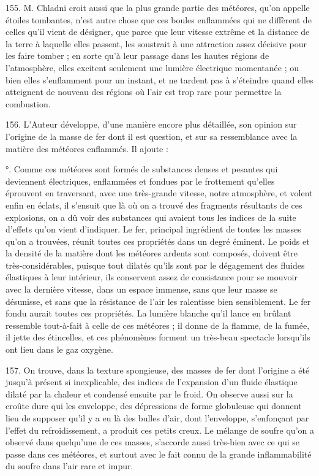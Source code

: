 \documentclass[a4paper, 11pt, oneside, polutonikogreek, french]{article}
\begin{document}
155. \og M. Chladni croit aussi que la plus grande partie des météores, qu'on appelle étoiles tombantes, n'est autre chose que ces boules enflammées qui ne diffèrent de celles qu'il vient de désigner, que parce que leur vitesse extrême et la distance de la terre à laquelle elles passent, les soustrait à une attraction assez décisive pour les faire tomber ; en sorte qu'à leur passage dans les hautes régions de l'atmosphère, elles excitent seulement une lumière électrique momentanée ; ou bien elles s'enflamment pour un instant, et ne tardent pas à s'éteindre quand elles atteignent de nouveau des régions où l'air est trop rare pour permettre la combustion. \fg

156. L'Auteur développe, d'une manière encore plus détaillée, son opinion sur l'origine de la masse de fer dont il est question, et sur sa ressemblance avec la matière des météores enflammés. Il ajoute :

°. Comme ces météores sont formés de substances denses et pesantes qui deviennent électriques, enflammées et fondues par le frottement qu'elles éprouvent en traversant, avec une très-grande vitesse, notre atmosphère, et volent enfin en éclats, il s'ensuit que là où on a trouvé des fragments résultants de ces explosions, on a dû voir des substances qui avaient tous les indices de la suite d'effets qu'on vient d'indiquer. Le fer, principal ingrédient de toutes les masses qu'on a trouvées, réunit toutes ces propriétés dans un degré éminent. Le poids et la densité de la matière dont les météores ardents sont composés, doivent être très-considérables, puisque tout dilatés qu'ils sont par le dégagement des fluides élastiques à leur intérieur, ils conservent assez de consistance pour se mouvoir avec la dernière vitesse, dans un espace immense, sans que leur masse se désunisse, et sans que la résistance de l'air les ralentisse bien sensiblement. Le fer fondu aurait toutes ces propriétés. La lumière blanche qu'il lance en brûlant ressemble tout-à-fait à celle de ces météores ; il donne de la flamme, de la fumée, il jette des étincelles, et ces phénomènes forment un très-beau spectacle lorsqu'ils ont lieu dans le gaz oxygène. \fg

157. On trouve, dans la texture spongieuse, des masses de fer dont l'origine a été jusqu’à présent si inexplicable, des indices de l'expansion d'un fluide élastique dilaté par la chaleur et condensé ensuite par le froid. On observe aussi sur la croûte dure qui les enveloppe, des dépressions de forme globuleuse qui donnent lieu de supposer qu'il y a eu là des bulles d'air, dont l'enveloppe, s'enfonçant par l'effet du refroidissement, a produit ces petits creux. Le mélange de soufre qu'on a observé dans quelqu'une de ces masses, s'accorde aussi très-bien avec ce qui se passe dans ces météores, et surtout avec le fait connu de la grande inflammabilité du soufre dans l'air rare et impur.
\end{document}

